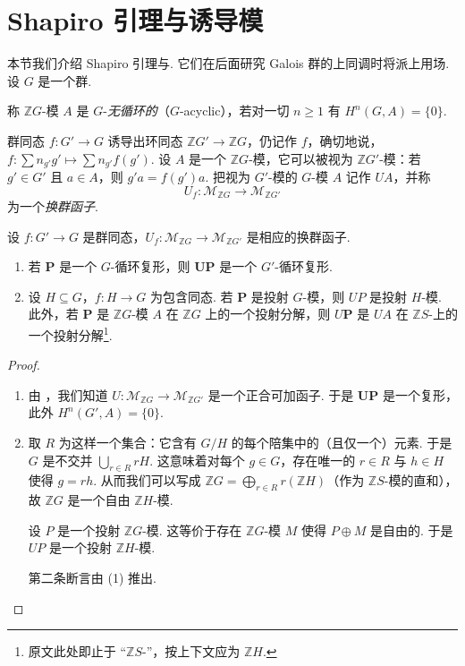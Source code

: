 \section{Shapiro 引理与诱导模}

本节我们介绍 Shapiro 引理与. 它们在后面研究 Galois 群的上同调时将派上用场.\\
设 $G$ 是一个群.

\begin{definition}\label{c4-def-5-1}
称 $\mathbb ZG$-模 $A$ 是 $G$-\emph{无循环的}（$G$-acyclic），若对一切 $n\geq 1$ 有 $H^n(G, A)=\{0\}$.
\end{definition}

\begin{definition}\label{c4-def-5-2}
群同态 $f:G'\to G$ 诱导出环同态 $\mathbb ZG'\to\mathbb ZG$，仍记作 $f$，确切地说，$f:\sum n_{g'}g'\mapsto\sum n_{g'}f(g')$. 设 $A$ 是一个 $\mathbb ZG$-模，它可以被视为 $\mathbb ZG'$-模：若 $g'\in G'$ 且 $a\in A$，则 $g'a=f(g')a$. 把视为 $G'$-模的 $G$-模 $A$ 记作 $UA$，并称
\[
U_f:\mathscr{M}_{\mathbb ZG}\to\mathscr{M}_{\mathbb ZG'}
\]
为一个\emph{换群函子}.
\end{definition}

\begin{lemma}\label{c4-lem-5-1}
设 $f:G'\to G$ 是群同态，$U_f:\mathscr{M}_{\mathbb ZG}\to\mathscr{M}_{\mathbb ZG'}$ 是相应的换群函子.
\begin{enumerate}[label=(\arabic*),leftmargin=*]
    \item 若 $\mathbf P$ 是一个 $G$-循环复形，则 $\mathbf{UP}$ 是一个 $G'$-循环复形.
    \item 设 $H\subseteq G$，$f:H\to G$ 为包含同态. 若 $\mathbf P$ 是投射 $G$-模，则 $UP$ 是投射 $H$-模. 此外，若 $\mathbf P$ 是 $\mathbb ZG$-模 $A$ 在 $\mathbb ZG$ 上的一个投射分解，则 $U\mathbf P$ 是 $UA$ 在 $\mathbb ZS$-上的一个投射分解\footnote{原文此处即止于 ``$\mathbb ZS$-''，按上下文应为 $\mathbb ZH$.}.
\end{enumerate}
\end{lemma}

\begin{proof}
\begin{enumerate}[label=(\arabic*),leftmargin=*]
    \item 由 \cite[Proposition~8.3, \S8.2]{rot09}，我们知道 $U:\mathscr{M}_{\mathbb ZG}\to\mathscr{M}_{\mathbb ZG'}$ 是一个正合可加函子. 于是 $\mathbf{UP}$ 是一个复形，此外 $H^n(G', A)=\{0\}$.
    \item 取 $R$ 为这样一个集合：它含有 $G/H$ 的每个陪集中的（且仅一个）元素. 于是 $G$ 是不交并 $\bigcup_{r\in R}rH$. 这意味着对每个 $g\in G$，存在唯一的 $r\in R$ 与 $h\in H$ 使得 $g=rh$. 从而我们可以写成 $\mathbb ZG=\bigoplus_{r\in R}r(\mathbb ZH)$（作为 $\mathbb ZS$-模的直和），故 $\mathbb ZG$ 是一个自由 $\mathbb ZH$-模.

设 $P$ 是一个投射 $\mathbb ZG$-模. 这等价于存在 $\mathbb ZG$-模 $M$ 使得 $P\oplus M$ 是自由的. 于是 $UP$ 是一个投射 $\mathbb ZH$-模.

第二条断言由 (1) 推出.
\end{enumerate}
\end{proof}

